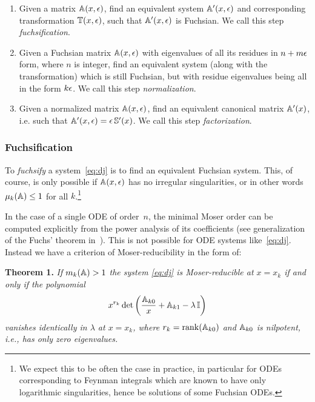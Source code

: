 \documentclass[12pt,a4paper]{article}
\begin{document}
\begin{enumerate}
    \item Given a matrix $\mathbb{A}(x,\epsilon)$, find an equivalent system $\mathbb{A}'(x,\epsilon)$ and corresponding transformation $\mathbb{T}(x,\epsilon)$, such that $\mathbb{A}'(x,\epsilon)$ is Fuchsian. We call this step \textit{fuchsification}.
    \item Given a Fuchsian matrix $\mathbb{A}(x,\epsilon)$ with eigenvalues of all its residues in $n+m\epsilon$ form, where $n$ is integer, find an equivalent system (along with the transformation) which is still Fuchsian, but with residue eigenvalues being all in the form $k\epsilon$. We call this step \textit{normalization}.
    \item Given a normalized matrix $\mathbb{A}(x,\epsilon)$, find an equivalent canonical matrix $\mathbb{A}'(x)$, i.e. such that $\mathbb{A}'(x,\epsilon) = \epsilon \, \mathbb{S}'(x)$. We call this step \textit{factorization}.
\end{enumerate}


\subsubsection{Fuchsification}
\label{sec:fuchs}

To \textit{fuchsify} a system~\eqref{eq:dj} is to find an equivalent Fuchsian system.
This, of course, is only possible if $\mathbb{A}(x,\epsilon)$ has no irregular singularities, or in other words $\mu_k(\mathbb{A})\le1$ for all $k$.\footnote{
    We expect this to be often the case in practice, in particular for ODEs corresponding to Feynman integrals which are known to have only logarithmic singularities, hence be solutions of some Fuchsian ODEs.
}

In the case of a single ODE of order~$n$, the minimal Moser order can be computed explicitly from the power analysis of its coefficients (see generalization of the Fuchs' theorem in~\cite{Mos59}).
This is not possible for ODE systems like~\eqref{eq:dj}.
Instead we have a criterion of Moser-reducibility in the form of:

\textbf{Theorem 1.}
{\em If $m_k(\mathbb{A}) > 1$ the system \eqref{eq:dj} is Moser-reducible at $x=x_k$ if and only if the polynomial}
\begin{equation}
\label{eq:red_cond}
    x^{r_k} \det\left(\frac{\mathbb{A}_{k0}}{x} + \mathbb{A}_{k1} - \lambda \,\mathbb{I}\right)
\end{equation}
{\em vanishes identically in $\lambda$ at $x=x_k$, where $r_k=\mathrm{rank}(\mathbb{A}_{k0})$ and $\mathbb{A}_{k0}$ is nilpotent, i.e., has only zero eigenvalues.}
\end{document}
